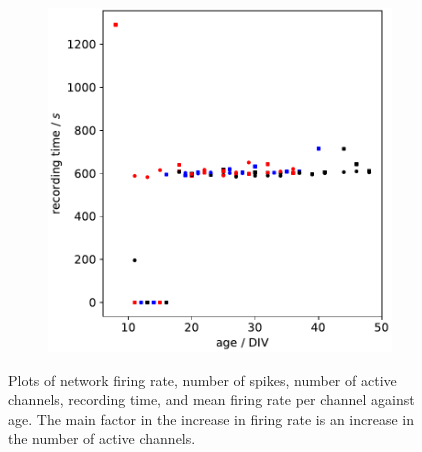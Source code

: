 \documentclass[11pt]{article}
\begin{document}
{\begin{figure}
\begin{subfigure}[b]{0.45\textwidth}
	\centering
	\includegraphics[width=\textwidth]{../plots/development_plots_recording_time.pdf}
\end{subfigure}

	\caption{Plots of network firing rate, number of spikes, number of active channels, recording time, and mean firing rate per channel against age. The main factor in the increase in firing rate is an increase in the number of active channels.}
	\label{fig:development}
\end{figure}


}
\end{document}
